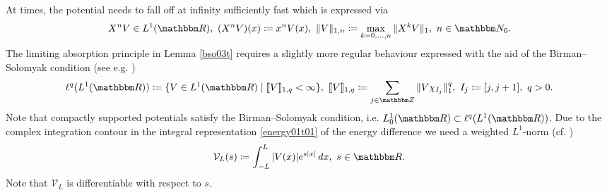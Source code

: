 At times, the potential needs to fall off at infinity sufficiently fast which is expressed via
\begin{equation}\label{V_decay1}
  X^n V\in L^1(\R),\ (X^nV)(x) \coloneqq x^n V(x),\
  \|V\|_{1,n} \coloneqq \max_{k=0,\ldots,n} \|X^k V\|_1 ,\ n\in\N_0 .
\end{equation}
The limiting absorption principle in Lemma \ref{bso03t} requires a slightly more regular behaviour
expressed with the aid of the Birman--Solomyak condition (see e.g. \cite[pp. 38]{Simon2005})
\begin{equation}\label{birman_solomyak}
  \ell^q(L^1(\R)) \coloneqq \{ V \in L^1(\R)\mid \llbracket V\rrbracket_{1,q} < \infty\},\
  \llbracket V\rrbracket_{1,q} \coloneqq \sum_{j\in\Z} \| V\chi_{I_j} \|_1^q,\
  I_j\coloneqq [j,j+1],\ q>0 .
\end{equation}
Note that compactly supported potentials satisfy the Birman--Solomyak condition, i.e. $L^1_0(\R)\subset\ell^q(L^1(\R))$.
Due to the complex integration contour in the integral representation \eqref{energy01t01} 
of the energy difference we need a weighted $L^1$-norm (cf. \cite[(3.25)]{KuettlerOtteSpitzer2014})
\begin{equation}\label{V_L}
  \mathcal{V}_L(s) \coloneqq \int_{-L}^L |V(x)| e^{s|x|} \, dx,\ s\in\R .
\end{equation}
Note that $\mathcal{V}_L$ is differentiable with respect to $s$.
